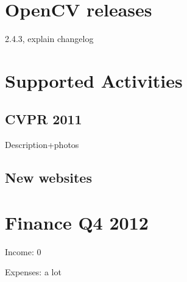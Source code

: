 \documentclass[a4paper,10pt]{article}
\begin{document}
\section*{OpenCV releases}
2.4.3, explain changelog
 
\section*{Supported Activities}

\subsection*{CVPR 2011}

Description+photos

\subsection*{New websites}

\section*{Finance Q4 2012}

Income: 0

Expenses: a lot
\end{document}
